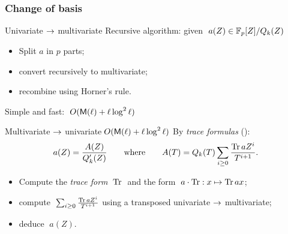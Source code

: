 \documentclass[10pt,usepdftitle=false]{beamer}
\begin{document}

\begin{frame}
  \frametitle{Change of basis}

  \begin{block}{Univariate $\rightarrow$ multivariate}
    Recursive algorithm: given $\;a(Z)\in\mathbb{F}_p[Z]/Q_k(Z)$
    \begin{itemize}
    \item Split $a$ in $p$ parts;
    \item convert recursively to multivariate;
    \item recombine using Horner's rule.
    \end{itemize}
    Simple and fast: \emph{$\;O(\mathsf{M}(\ell) + \ell\log^2\ell)$}
  \end{block}

  \vspace{-1mm}

  \begin{block}{Multivariate $\rightarrow$ univariate\hfill\alert{$\;O(\mathsf{M}(\ell) + \ell\log^2\ell)$}}
    By \textit{trace formulas} (\cite{rouiller99}):
    \[
    a(Z) = \frac{A(Z)}{Q_k'(Z)}
    \qquad\text{where}\qquad
    A(T) = Q_k(T)\sum_{i\ge 0}\frac{\operatorname{Tr} aZ^i}{T^{i+1}}
    \text{.}\]
    \vspace{-4mm}
    \begin{itemize}
    \item Compute the \textit{trace form} $\;\operatorname{Tr}\;$ and the form
      $\;a\cdot\operatorname{Tr} : x\mapsto \operatorname{Tr} ax$;
    \item compute $\;\sum_{i\ge 0}\frac{\operatorname{Tr} aZ^i}{T^{i+1}}$
      \alert{using a transposed univariate $\rightarrow$ multivariate};
    \item deduce $\;a(Z)$.
    \end{itemize}
  \end{block}
\end{frame}





  
\end{document}
